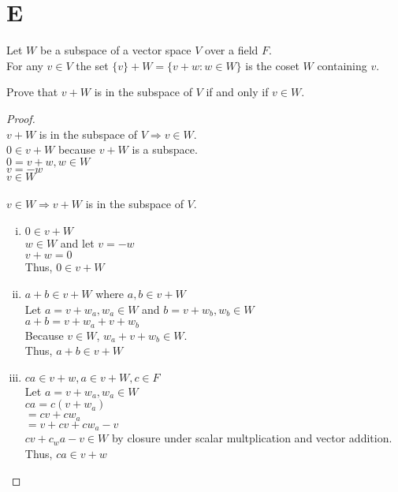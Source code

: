 \documentclass[11pt]{scrartcl}
\begin{document}
\section{E}
Let $W$ be a subspace of a vector space $V$ over a field $F$.\\
For any $v \in V$ the set $\{v\} + W = \{v + w : w \in W \}$ is the coset $W$ containing $v$.
\begin{enumerate}[label=\alph*.]
	\item{
		Prove that $v + W$ is in the subspace of $V$ if and only if $v \in W$.
		\begin{proof}
			\-\\
			$v + W$ is in the subspace of $V \Rightarrow v \in W$.\\
			$0 \in v + W$ because $v + W$ is a subspace.\\
			$0 = v + w, w \in W$\\
			$v = -w$\\
			$v \in W$\\ 
			\-\\
			$v \in W \Rightarrow v + W$ is in the subspace of $V$.
			\begin{enumerate}[i.]
			\item{
			$0 \in v + W$\\
			$w \in W$ and let $v = -w$\\
			$v + w = 0$\\
			Thus, $0 \in v + W$
			}
			\item{
			$a + b \in v + W$ where $a,b \in v + W$\\
			Let $a = v + w_a, w_a \in W$ and $b = v + w_b, w_b \in W$ \\
			$a + b = v + w_a + v + w_b$\\
			Because $v \in W$, $w_a + v + w_b \in W$.\\
			Thus, $a + b \in v + W$
			}
		\item{
			$ca \in v + w, a \in v+W, c \in F$\\
			Let $a = v + w_a, w_a \in W$\\
			$ca = c(v + w_a)$\\
			$= cv + cw_a$\\
			$= v + cv + cw_a - v$\\
			$cv + c_wa - v \in W$ by closure under scalar multplication and vector addition.\\
			Thus, $ca \in v + w$
			}
		\end{enumerate}
		\end{proof}
	\item{
}}
\end{enumerate}
\end{document}

